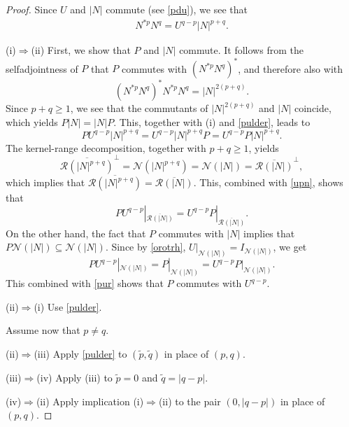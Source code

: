 \documentclass[10pt,a4paper]{amsart}
\newcommand*{\Ge}{\geqslant}
\newcommand*{\nul}{\mathscr{N}}
\newcommand*{\ran}{\mathscr{R}}
\begin{document}
   \begin{proof}
Since $U$ and $|N|$ commute (see
\eqref{pdu}), we see that
   \begin{align} \label{pulder}
N^{*p}N^q=U^{q-p}|N|^{p+q}.
   \end{align}

(i)$\Rightarrow$(ii) First, we show that $P$ and $|N|$
commute. It follows from the selfadjointness of $P$
that $P$ commutes with $(N^{*p}N^q)^*$, and therefore
also with
   \begin{equation*}
(N^{*p}N^q)^*N^{*p}N^q=|N|^{2(p+q)}.
   \end{equation*}
Since $p+q \Ge 1$, we see that the commutants of
$|N|^{2(p+q)}$ and $|N|$ coincide, which yields
$P|N|=|N|P$. This, together with (i) and
\eqref{pulder}, leads to
   \begin{equation} \label{upn}
PU^{q-p}|N|^{p+q}=U^{q-p}|N|^{p+q}P=U^{q-p}P|N|^{p+q}.
   \end{equation}
The kernel-range decomposition, together with $p+q \Ge
1$, yields
   \begin{equation*}
\overline{\ran(|N|^{p+q})}^\perp =
\nul(|N|^{p+q})=\nul(|N|) =
\overline{\ran(|N|)}^\perp,
   \end{equation*}
which implies that
$\overline{\ran(|N|^{p+q})} =
\overline{\ran(|N|)}$. This, combined with
\eqref{upn}, shows that
   \begin{equation}\label{pur}
PU^{q-p}|_{\overline{\ran(|N|)}}=U^{q-p}P|_{\overline{\ran(|N|)}}.
   \end{equation}
On the other hand, the fact that $P$
commutes with $|N|$ implies that
$P\nul(|N|)\subseteq \nul(|N|)$. Since by
\eqref{orotrh},
$U|_{{\nul(|N|)}}=I_{{\nul(|N|)}}$, we get
   \begin{equation*}
PU^{q-p}|_{{\nul(|N|)}}=P|_{{\nul(|N|)}}=U^{q-p}P|_{{\nul(|N|)}}.
   \end{equation*}
This combined with \eqref{pur} shows that
$P$ commutes with $U^{q-p}$.

(ii)$\Rightarrow$(i) Use \eqref{pulder}.

Assume now that $p\neq q$.

(ii)$\Rightarrow$(iii) Apply \eqref{pulder} to
$(\tilde p, \tilde q)$ in place of $(p,q)$.

(iii)$\Rightarrow$(iv) Apply (iii) to
$\tilde p= 0$ and $\tilde q=|q-p|$.

(iv)$\Rightarrow$(ii) Apply implication
(i)$\Rightarrow$(ii) to the pair $(0,|q-p|)$
in place of $(p,q)$.
   \end{proof}
\end{document}

